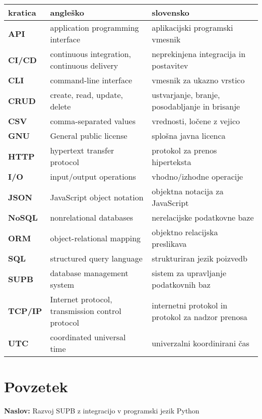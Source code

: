 \documentclass[a4paper,12pt,openright]{book}
\newcommand{\ttitle}{Razvoj SUPB z integracijo v programski jezik Python}
\newcommand{\clearemptydoublepage}{\newpage{\pagestyle{empty}\cleardoublepage}}
\begin{document}
\noindent\begin{tabular}{p{}|p{}|p{}}
  {\bf kratica} & {\bf angleško}                              & {\bf slovensko} \\ \hline
  {\bf API} & application programming interface & aplikacijski programski vmesnik \\
  {\bf CI/CD} & continuous integration, continuous delivery & neprekinjena integracija in postavitev \\
  {\bf CLI} & command-line interface & vmesnik za ukazno vrstico \\
  {\bf CRUD} & create, read, update, delete & ustvarjanje, branje, posodabljanje in brisanje \\
  {\bf CSV} & comma-separated values & vrednosti, ločene z vejico \\
  {\bf GNU} & General public license & splošna javna licenca \\
  {\bf HTTP} & hypertext transfer protocol & protokol za prenos hiperteksta \\
  {\bf I/O} & input/output operations & vhodno/izhodne operacije \\
  {\bf JSON} & JavaScript object notation & objektna notacija za JavaScript \\
  {\bf NoSQL} & nonrelational databases & nerelacijske podatkovne baze \\
  {\bf ORM} & object-relational mapping & objektno relacijska preslikava \\
  {\bf SQL} & structured query language & strukturiran jezik poizvedb \\
  {\bf SUPB} & database management system & sistem za upravljanje podatkovnih baz \\
  {\bf TCP/IP} & Internet protocol, transmission control protocol & internetni protokol in protokol za nadzor prenosa \\
  {\bf UTC} & coordinated universal time & univerzalni koordinirani čas \\
\end{tabular}


\clearemptydoublepage

{}
\chapter*{Povzetek}

\noindent\textbf{Naslov:} \ttitle
\bigskip
\end{document}
